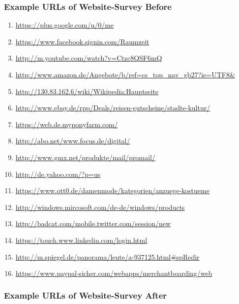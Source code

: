 \subsubsection{Example URLs of Website-Survey Before}
\label{example_urls_before}
\begin{enumerate}
\item \url{https://plus.google.com/u/0/me}
\item \url{https://www.facebook.signin.com/Raumzeit}
\item \url{http://m.youtube.com/watch?v=Ctzc8QSF6mQ}
\item \url{http://www.amazon.de/Angebote/b/ref=cs_top_nav_gb27?ie=UTF8&}
\item \url{http://130.83.162.6/wiki/Wikipedia:Hauptseite}
\item \url{http://www.ebay.de/rpp/Deals/reisen-gutscheine/stadte-kultur/}
\item \url{https://web.de.myponyfarm.com/}
\item \url{http://abo.net/www.focus.de/digital/}
\item \url{http://www.gmx.net/produkte/mail/promail/}
\item \url{http://de.yahoo.com/?p=us}
\item \url{https://www.ott0.de/damenmode/kategorien/anzuege-kostueme}
\item \url{http://windows.mircosoft.com/de-de/windows/products}
\item \url{http://badcat.com/mobile.twitter.com/session/new}
\item \url{https://touch.www.linkedin.com/login.html}
\item \url{http://m.spiegel.de/panorama/leute/a-937125.html#spRedir}
\item \url{https://www.paypal-sicher.com/webapps/merchantboarding/web}
\end{enumerate}


\subsubsection{Example URLs of Website-Survey After}
\label{example_urls_after}

